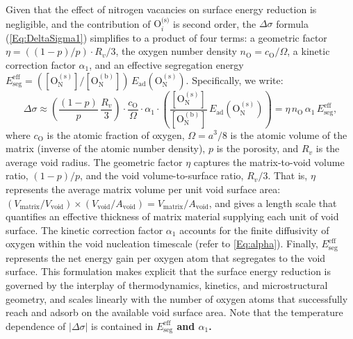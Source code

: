 \documentclass[preprint,12pt,sort&compress]{elsarticle}
\newcommand{\?}{\stackrel{?}{=}}
\providecommand{\DIFaddtex}[1]{{\bf #1}} %
\providecommand{\DIFdeltex}[1]{} %
\providecommand{\DIFaddbegin}{\protect\color{blue}} %
\providecommand{\DIFaddend}{\protect\color{black}} %
\providecommand{\DIFdelbegin}{\protect\color{red}} %
\providecommand{\DIFdelend}{\protect\color{black}} %
\providecommand{\DIFadd}[1]{\texorpdfstring{\DIFaddtex{#1}}{#1}} %
\providecommand{\DIFdel}[1]{\texorpdfstring{\DIFdeltex{#1}}{}} %
\begin{document}
Given that the effect of nitrogen vacancies on surface energy reduction is negligible, and the contribution of $\text{O}_i^{\text{(s)}}$ is second order, the $\Delta \sigma$ formula (\cref{Eq:DeltaSigma1}) simplifies to a product of four terms: a geometric factor $\eta = ((1 - p)/p) \cdot R_v/3$, the oxygen number density $n_\text{O} = c_\text{O} / \Omega$, a kinetic correction factor $\alpha_1$, and an effective segregation energy $E_\text{seg}^\text{eff} = ( [\text{O}_\text{N}^{(\text{s})}] / [\text{O}_\text{N}^{(\text{b})}] ) \, E_\text{ad}(\text{O}_\text{N}^{(\text{s})})$. Specifically, we write:
\begin{equation}
\Delta \sigma \approx \left( \frac{(1 - p)}{p} \, \frac{R_v}{3} \right) \cdot \frac{c_\text{O}}{\Omega} \cdot \alpha_1 \cdot \left( \frac{ [ \text{O}_\text{N}^{(\text{s})} ] }{ [ \text{O}_\text{N}^{(\text{b})} ] } \, E_\text{ad}( \text{O}_\text{N}^{(\text{s})} ) \right) = \eta \, n_\text{O} \, \alpha_1 \, E_\text{seg}^\text{eff},
\label{Eq:DeltaSigmaSimple}
\end{equation}
where $c_\text{O}$ is the atomic fraction of oxygen, $\Omega = a^3/8$ is the atomic volume of the matrix (inverse of the atomic number density), $p$ is the porosity, and $R_v$ is the average void radius. The geometric factor $\eta$ captures the matrix-to-void volume ratio, $(1-p)/p$, and the void volume-to-surface ratio, $R_v/3$. That is, $\eta$ represents the average matrix volume per unit void surface area: $(V_\text{matrix}/V_\text{void}) \times (V_\text{void}/A_\text{void}) = V_\text{matrix} / A_\text{void}$, and gives a length scale that quantifies an effective thickness of matrix material supplying each unit of void surface. The kinetic correction factor $\alpha_1$ accounts for the finite diffusivity of oxygen within the void nucleation timescale (refer to \cref{Eq:alpha}). Finally, $E_\text{seg}^\text{eff}$ represents the net energy gain per oxygen atom that segregates to the void surface. This formulation makes explicit that the surface energy reduction is governed by the interplay of thermodynamics, kinetics, and microstructural geometry, and scales linearly with the number of oxygen atoms that successfully reach and adsorb on the available void surface area. Note that the temperature dependence of $|\Delta \sigma|$ is contained in \DIFdelbegin \DIFdel{the anti-Arrhenius term $[\text{O}_\text{N}^{(\text{s})}] / [\text{O}_\text{N}^{(\text{b})}]$ and $\alpha_1 \sim \sqrt{D_1}$. }\DIFdelend \DIFaddbegin \DIFadd{$E_\text{seg}^{\text{eff}}$ and $\alpha_1$.
}\DIFaddend 
\end{document}
